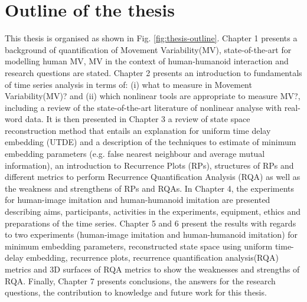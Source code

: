 \newpage
\section{Outline of the thesis}
This thesis is organised as shown in Fig. \ref{fig:thesis-outline}.
Chapter 1 presents a background of quantification of 
Movement Variability(MV), state-of-the-art for modelling human MV,
MV in the context of human-humanoid interaction and research questions
are stated.
Chapter 2 presents an introduction to fundamentals of time series
analysis in terms of: (i) what to measure in Movement Variability(MV)?
and (ii) which nonlinear tools are appropriate to measure MV?, 
including a review of the state-of-the-art literature of nonlinear 
analyse with real-word data. 
It is then presented in Chapter 3 a review of state space 
reconstruction method that entails an explanation for uniform time 
delay embedding (UTDE) and a description of the techniques to estimate 
of minimum embedding parameters (e.g. false nearest neighbour and 
average mutual information), an introduction to Recurrence Plots (RPs),
structures of RPs and different metrics to perform 
Recurrence Quantification Analysis (RQA) as well as the 
weakness and strengthens of RPs and RQAs.
In Chapter 4, the experiments for human-image imitation and human-humanoid 
imitation are presented describing aims, participants, activities in the 
experiments, equipment, ethics and preparations of the time series.
Chapter 5 and 6 present the results with regards to two experiments
(human-image imitation and human-humanoid imitation) for 
minimum embedding parameters, reconstructed state space using 
uniform time-delay embedding, recurrence plots, recurrence quantification 
analysis(RQA) metrics and 3D surfaces of RQA metrics to show the
weaknesses and strengths of RQA.
Finally, Chapter 7 presents conclusions, the answers for the
research questions, the contribution to knowledge and 
future work for this thesis.

